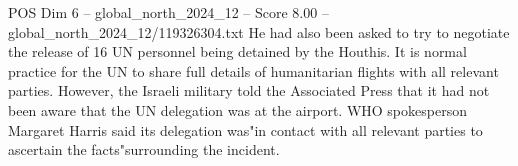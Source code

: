 \begin{textsample}{POS Dim 6 – global\_north\_2024\_12 – Score 8.00 – global\_north\_2024\_12/119326304.txt}
He had also been asked to try to negotiate the release of 16 UN personnel being detained by the Houthis.
It is normal practice for the UN to share full details of humanitarian flights with all relevant parties.
However, the Israeli military told the Associated Press that it had not been aware that the UN delegation was at the airport.
WHO spokesperson Margaret Harris said its delegation was"in contact with all relevant parties to ascertain the facts"surrounding the incident.

\end{textsample}

